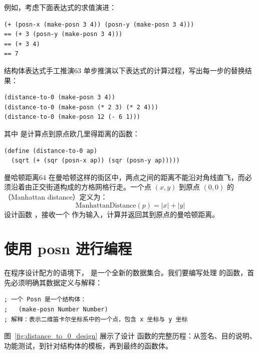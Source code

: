 例如，考虑下面表达式的求值演进：
\begin{lstlisting}[language=BSL]
  (+ (posn-x (make-posn 3 4)) (posn-y (make-posn 3 4)))
== (+ 3 (posn-y (make-posn 3 4)))
== (+ 3 4)
== 7
\end{lstlisting}

\begin{exercise}{结构体表达式手工推演}{63}
单步推演以下表达式的计算过程，写出每一步的替换结果：
\begin{lstlisting}[language=BSL]
(distance-to-0 (make-posn 3 4))
(distance-to-0 (make-posn (* 2 3) (* 2 4)))
(distance-to-0 (make-posn 12 (- 6 1)))
\end{lstlisting}
其中  是计算点到原点欧几里得距离的函数：
\begin{lstlisting}[language=BSL]
(define (distance-to-0 ap)
  (sqrt (+ (sqr (posn-x ap)) (sqr (posn-y ap)))))
\end{lstlisting}
\end{exercise}

\begin{exercise}{曼哈顿距离}{64}
在曼哈顿这样的街区中，两点之间的距离不能沿对角线直飞，而必须沿着由正交街道构成的方格网格行走。一个点 $(x, y)$ 到原点 $(0, 0)$ 的（Manhattan distance）定义为：
\[
\text{ManhattanDistance}(p) = |x| + |y|
\]
设计函数 ，接收一个  作为输入，计算并返回其到原点的曼哈顿距离。
\end{exercise}

\section{使用 posn 进行编程}
\label{sec:5.3_programming_with_posn}

在程序设计配方的语境下， 是一个全新的数据集合。我们要编写处理  的函数，首先必须明确其数据定义与解释：

\begin{lstlisting}[language=BSL]
; 一个 Posn 是一个结构体：
;   (make-posn Number Number)
; 解释：表示二维笛卡尔坐标系中的一个点，包含 x 坐标与 y 坐标
\end{lstlisting}

图~\ref{fig:distance_to_0_design} 展示了设计  函数的完整历程：从签名、目的说明、功能测试，到针对结构体的模板，再到最终的函数体。


